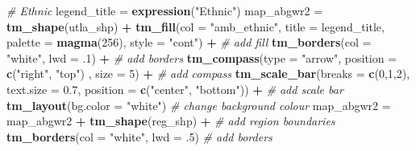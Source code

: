\documentclass[
]{book}
\newenvironment{Shaded}{\begin{snugshade}}{\end{snugshade}}
\newcommand{\CommentTok}[1]{\textcolor[rgb]{0.56,0.35,0.01}{\textit{#1}}}
\newcommand{\DataTypeTok}[1]{\textcolor[rgb]{0.13,0.29,0.53}{#1}}
\newcommand{\DecValTok}[1]{\textcolor[rgb]{0.00,0.00,0.81}{#1}}
\newcommand{\FloatTok}[1]{\textcolor[rgb]{0.00,0.00,0.81}{#1}}
\newcommand{\KeywordTok}[1]{\textcolor[rgb]{0.13,0.29,0.53}{\textbf{#1}}}
\newcommand{\NormalTok}[1]{#1}
\newcommand{\OperatorTok}[1]{\textcolor[rgb]{0.81,0.36,0.00}{\textbf{#1}}}
\newcommand{\StringTok}[1]{\textcolor[rgb]{0.31,0.60,0.02}{#1}}
\begin{document}
\begin{Shaded}
\begin{Highlighting}[]
  \CommentTok{# Ethnic}
\NormalTok{legend_title =}\StringTok{ }\KeywordTok{expression}\NormalTok{(}\StringTok{"Ethnic"}\NormalTok{)}
\NormalTok{map_abgwr2 =}\StringTok{ }\KeywordTok{tm_shape}\NormalTok{(utla_shp) }\OperatorTok{+}
\StringTok{  }\KeywordTok{tm_fill}\NormalTok{(}\DataTypeTok{col =} \StringTok{"amb_ethnic"}\NormalTok{, }\DataTypeTok{title =}\NormalTok{ legend_title, }\DataTypeTok{palette =} \KeywordTok{magma}\NormalTok{(}\DecValTok{256}\NormalTok{), }\DataTypeTok{style =} \StringTok{"cont"}\NormalTok{) }\OperatorTok{+}\StringTok{ }\CommentTok{# add fill}
\StringTok{  }\KeywordTok{tm_borders}\NormalTok{(}\DataTypeTok{col =} \StringTok{"white"}\NormalTok{, }\DataTypeTok{lwd =} \FloatTok{.1}\NormalTok{)  }\OperatorTok{+}\StringTok{ }\CommentTok{# add borders}
\StringTok{  }\KeywordTok{tm_compass}\NormalTok{(}\DataTypeTok{type =} \StringTok{"arrow"}\NormalTok{, }\DataTypeTok{position =} \KeywordTok{c}\NormalTok{(}\StringTok{"right"}\NormalTok{, }\StringTok{"top"}\NormalTok{) , }\DataTypeTok{size =} \DecValTok{5}\NormalTok{) }\OperatorTok{+}\StringTok{ }\CommentTok{# add compass}
\StringTok{  }\KeywordTok{tm_scale_bar}\NormalTok{(}\DataTypeTok{breaks =} \KeywordTok{c}\NormalTok{(}\DecValTok{0}\NormalTok{,}\DecValTok{1}\NormalTok{,}\DecValTok{2}\NormalTok{), }\DataTypeTok{text.size =} \FloatTok{0.7}\NormalTok{, }\DataTypeTok{position =}  \KeywordTok{c}\NormalTok{(}\StringTok{"center"}\NormalTok{, }\StringTok{"bottom"}\NormalTok{)) }\OperatorTok{+}\StringTok{ }\CommentTok{# add scale bar}
\StringTok{  }\KeywordTok{tm_layout}\NormalTok{(}\DataTypeTok{bg.color =} \StringTok{"white"}\NormalTok{) }\CommentTok{# change background colour}
\NormalTok{map_abgwr2 =}\StringTok{ }\NormalTok{map_abgwr2 }\OperatorTok{+}\StringTok{ }\KeywordTok{tm_shape}\NormalTok{(reg_shp) }\OperatorTok{+}\StringTok{ }\CommentTok{# add region boundaries}
\StringTok{  }\KeywordTok{tm_borders}\NormalTok{(}\DataTypeTok{col =} \StringTok{"white"}\NormalTok{, }\DataTypeTok{lwd =} \FloatTok{.5}\NormalTok{) }\CommentTok{# add borders}


\end{Highlighting}
\end{Shaded}
\end{document}
